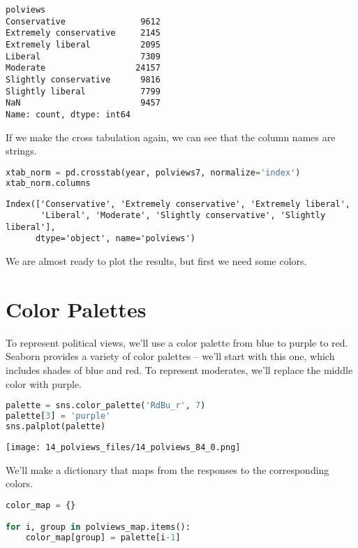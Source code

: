 \begin{lstlisting}[style=output]
polviews
Conservative               9612
Extremely conservative     2145
Extremely liberal          2095
Liberal                    7309
Moderate                  24157
Slightly conservative      9816
Slightly liberal           7799
NaN                        9457
Name: count, dtype: int64
\end{lstlisting}

\pagebreak

If we make the cross tabulation again, we can see that the column names
are strings.

\begin{lstlisting}[language=Python,style=source]
xtab_norm = pd.crosstab(year, polviews7, normalize='index')
xtab_norm.columns
\end{lstlisting}

\begin{lstlisting}[style=output]
Index(['Conservative', 'Extremely conservative', 'Extremely liberal',
       'Liberal', 'Moderate', 'Slightly conservative', 'Slightly liberal'],
      dtype='object', name='polviews')
\end{lstlisting}

We are almost ready to plot the results, but first we need some colors.

\section{Color Palettes}\label{color-palettes}

To represent political views, we'll use a color palette from blue to
purple to red. Seaborn provides a variety of color palettes -- we'll
start with this one, which includes shades of blue and red. To represent
moderates, we'll replace the middle color with purple.

\begin{lstlisting}[language=Python,style=source]
palette = sns.color_palette('RdBu_r', 7)
palette[3] = 'purple'
sns.palplot(palette)
\end{lstlisting}

\begin{center}
\texttt{[image: 14\_polviews\_files/14\_polviews\_84\_0.png]}
\end{center}

We'll make a dictionary that maps from the responses to the
corresponding colors.

\begin{lstlisting}[language=Python,style=source]
color_map = {}

for i, group in polviews_map.items():
    color_map[group] = palette[i-1]
\end{lstlisting}


